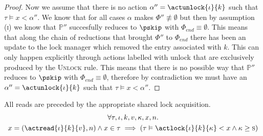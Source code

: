 \begin{proof}
Now we assume that there is no action $\alpha'' = \actunlock{\iota}{k}$ such that $\tau \vDash x < \alpha''$. We know that for all cases $\alpha$ makes $\Phi'' \not\equiv \emptyset$ but then by assumption (\textsc{i}) we know that $\mathds{P}''$ succesfully reduces to $\pskip$ with $\Phi_{end} \equiv \emptyset$. This means that along the chain of reductions that brought $\Phi''$ to $\Phi_{end}$ there has been an update to the lock manager which removed the entry associated with $k$. This can only happen explicitly through actions labelled with \textsf{unlock} that are exclusively produced by the \textsc{Unlock} rule. This means that there is no possible way that $\mathds{P}''$ reduces to $\pskip$ with $\Phi_{end} \equiv \emptyset$, therefore by contradiction we must have an $\alpha'' = \actunlock{\iota}{k}$ such that $\tau \vDash x < \alpha''$.
\end{proof}

\lem \label{lem:read} All reads are preceded by the appropriate shared lock acquisition.
\begin{gather*}
\forall \tau, \iota, k, v, \kappa, x, n \ldotp \\
x = (\actread{\iota}{k}{v}, n) \land x \in \tau \implies \left( \tau \vDash \actlock{\iota}{k}{\kappa} < x \land \kappa \geq \textsc{s} \right)
\end{gather*}

